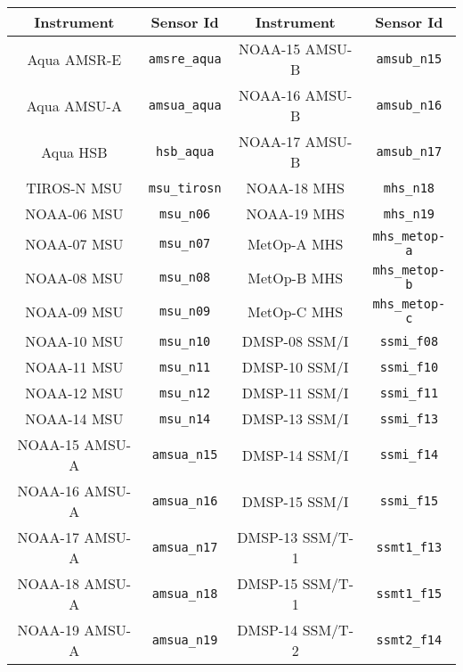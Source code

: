 \begin{table}[htp]
  \centering
  \begin{tabular}{|c|c||c|c|}
    \hline
    \sffamily\textbf{Instrument} & \sffamily\textbf{Sensor Id} & \sffamily\textbf{Instrument} & \sffamily\textbf{Sensor Id} \\
    \hline\hline
Aqua AMSR-E     & \texttt{amsre\_aqua}    & NOAA-15 AMSU-B   & \texttt{amsub\_n15}         \\
Aqua AMSU-A     & \texttt{amsua\_aqua}    & NOAA-16 AMSU-B   & \texttt{amsub\_n16}         \\
Aqua HSB        & \texttt{hsb\_aqua}      & NOAA-17 AMSU-B   & \texttt{amsub\_n17}         \\
TIROS-N MSU     & \texttt{msu\_tirosn}    & NOAA-18 MHS      & \texttt{mhs\_n18}           \\
NOAA-06 MSU     & \texttt{msu\_n06}       & NOAA-19 MHS      & \texttt{mhs\_n19}           \\
NOAA-07 MSU     & \texttt{msu\_n07}       & MetOp-A MHS      & \texttt{mhs\_metop-a}       \\
NOAA-08 MSU     & \texttt{msu\_n08}       & MetOp-B MHS      & \texttt{mhs\_metop-b}       \\
NOAA-09 MSU     & \texttt{msu\_n09}       & MetOp-C MHS      & \texttt{mhs\_metop-c}       \\
NOAA-10 MSU     & \texttt{msu\_n10}       & DMSP-08 SSM/I    & \texttt{ssmi\_f08}          \\
NOAA-11 MSU     & \texttt{msu\_n11}       & DMSP-10 SSM/I    & \texttt{ssmi\_f10}          \\
NOAA-12 MSU     & \texttt{msu\_n12}       & DMSP-11 SSM/I    & \texttt{ssmi\_f11}          \\
NOAA-14 MSU     & \texttt{msu\_n14}       & DMSP-13 SSM/I    & \texttt{ssmi\_f13}          \\
NOAA-15 AMSU-A  & \texttt{amsua\_n15}     & DMSP-14 SSM/I    & \texttt{ssmi\_f14}          \\
NOAA-16 AMSU-A  & \texttt{amsua\_n16}     & DMSP-15 SSM/I    & \texttt{ssmi\_f15}          \\
NOAA-17 AMSU-A  & \texttt{amsua\_n17}     & DMSP-13 SSM/T-1  & \texttt{ssmt1\_f13}         \\
NOAA-18 AMSU-A  & \texttt{amsua\_n18}     & DMSP-15 SSM/T-1  & \texttt{ssmt1\_f15}         \\
NOAA-19 AMSU-A  & \texttt{amsua\_n19}     & DMSP-14 SSM/T-2  & \texttt{ssmt2\_f14}         \\

\end{tabular}
\end{table}
